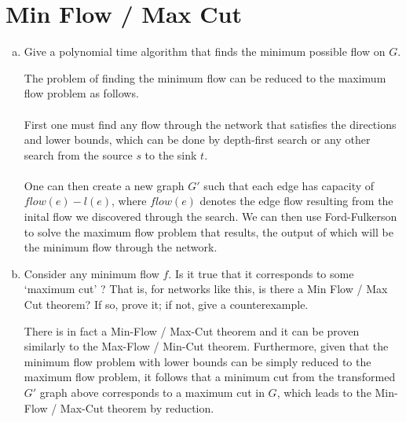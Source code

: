 \documentclass[12pt]{article}
\begin{document}
\section{Min Flow / Max Cut}\label{min flow}
\begin{enumerate}[(a)]
\item Give a polynomial time algorithm that finds the minimum possible flow on $G$.
\begin{addmargin}[2em]{2em}
The problem of finding the minimum flow can be reduced to the maximum flow problem as follows. \\ \\
First one must find any flow through the network that satisfies the directions and lower bounds, which can be done by depth-first search or any other search from the source $s$ to the sink $t$. \\ \\
One can then create a new graph $G'$ such that each edge has capacity of $flow(e) - l(e)$, where $flow(e)$ denotes the edge flow resulting from the inital flow we discovered through the search. We can then use Ford-Fulkerson to solve the maximum flow problem that results, the output of which will be the minimum flow through the network.
\end{addmargin}
\item Consider any minimum flow $f$. Is it true that it corresponds to some ‘maximum cut’ ? That is, for networks like this, is there a Min Flow / Max Cut theorem? If so, prove it; if not, give a counterexample.
\begin{addmargin}[2em]{2em}
There is in fact a Min-Flow / Max-Cut theorem and it can be proven similarly to the Max-Flow / Min-Cut theorem. Furthermore, given that the minimum flow problem with lower bounds can be simply reduced to the maximum flow problem, it follows that a minimum cut from the transformed $G'$ graph above corresponds to a maximum cut in $G$, which leads to the Min-Flow / Max-Cut theorem by reduction.
\end{addmargin}
\end{enumerate}
\end{document}
